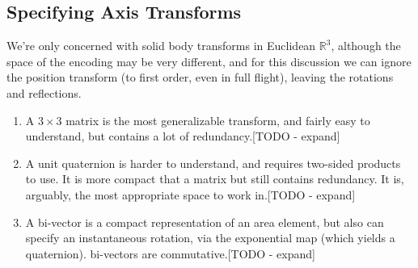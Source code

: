\documentclass{article}
\begin{document}
\subsection{Specifying Axis Transforms}
We're only concerned with solid body transforms in Euclidean
$\mathbb{R}^3$, although the space of the encoding may be very
different, and for this discussion we can ignore the position
transform (to first order, even in full flight), leaving the rotations
and reflections.
\begin{enumerate}
\item A $3\times3$ matrix is the most generalizable transform, and fairly easy
to understand, but contains a lot of redundancy.[TODO - expand]
\item A unit quaternion is harder to understand, and requires two-sided
products to use. It is more compact that a matrix but still contains
redundancy. It is, arguably, the most appropriate space to work
in.[TODO - expand]
\item A bi-vector is a compact representation of an area element, but also
can specify an instantaneous rotation, via the exponential map (which
yields a quaternion). bi-vectors are commutative.[TODO - expand]
\end{enumerate}
\end{document}
